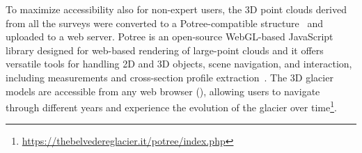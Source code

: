 To maximize accessibility also for non-expert users, the 3D point clouds derived from all the surveys were converted to a Potree-compatible structure~\citep{schutz2016potree} and uploaded to a web server.
Potree is an open-source WebGL-based JavaScript library designed for web-based rendering of large-point 
clouds and it offers versatile tools for handling 2D and 3D objects, scene navigation, and interaction, including measurements and cross-section profile extraction~\citep{Gaspari2024, Fascia2024}.
The 3D glacier models are accessible from any web browser (), allowing users to navigate through different years and experience the evolution of the glacier over time\footnote{\label{the-belvedere-glacier-website}\url{https://thebelvedereglacier.it/potree/index.php}}.

